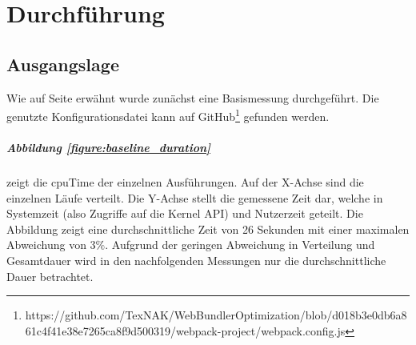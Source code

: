 \documentclass[11pt]{report}
\begin{document}
	\clearpage

	\chapter{Durchführung}
		\section{Ausgangslage}
			Wie auf Seite \pageref{baseline-build} erwähnt wurde zunächst eine Basismessung durchgeführt. Die genutzte Konfigurationsdatei kann auf GitHub\footnote{https://github.com/TexNAK/WebBundlerOptimization/blob/d018b3e0db6a861c4f41e38e7265ca8f9d500319/webpack-project/webpack.config.js} gefunden werden.
			\paragraph{Abbildung \ref{figure:baseline_duration}} zeigt die \Gls{cpuTime} der einzelnen Ausführungen. Auf der X-Achse sind die einzelnen Läufe verteilt. Die Y-Achse stellt die gemessene Zeit dar, welche in Systemzeit (also Zugriffe auf die Kernel API) und Nutzerzeit geteilt. Die Abbildung zeigt eine durchschnittliche Zeit von 26 Sekunden mit einer maximalen Abweichung von $3\%$. Aufgrund der geringen Abweichung in Verteilung und Gesamtdauer wird in den nachfolgenden Messungen nur die durchschnittliche Dauer betrachtet.
\end{document}
